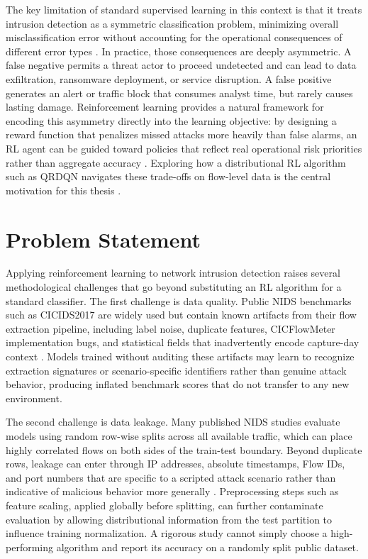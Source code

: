 The key limitation of standard supervised learning in this context is that it treats intrusion detection as a symmetric classification problem, minimizing overall misclassification error without accounting for the operational consequences of different error types \parencite{Axelsson1999BaseRate}. In practice, those consequences are deeply asymmetric. A false negative permits a threat actor to proceed undetected and can lead to data exfiltration, ransomware deployment, or service disruption. A false positive generates an alert or traffic block that consumes analyst time, but rarely causes lasting damage. Reinforcement learning provides a natural framework for encoding this asymmetry directly into the learning objective: by designing a reward function that penalizes missed attacks more heavily than false alarms, an RL agent can be guided toward policies that reflect real operational risk priorities rather than aggregate accuracy \parencite{SuttonBarto2018RL,Lee2002CostSensitiveIDS}. Exploring how a distributional RL algorithm such as QRDQN navigates these trade-offs on flow-level data is the central motivation for this thesis \parencite{Dabney2018QRDQN}.

\section{Problem Statement}
Applying reinforcement learning to network intrusion detection raises several methodological challenges that go beyond substituting an RL algorithm for a standard classifier. The first challenge is data quality. Public NIDS benchmarks such as CICIDS2017 are widely used but contain known artifacts from their flow extraction pipeline, including label noise, duplicate features, CICFlowMeter implementation bugs, and statistical fields that inadvertently encode capture-day context \parencite{Ring2019DatasetSurvey,Engelen2021CICIDSIssues,Lanvin2023Errors}. Models trained without auditing these artifacts may learn to recognize extraction signatures or scenario-specific identifiers rather than genuine attack behavior, producing inflated benchmark scores that do not transfer to any new environment.

The second challenge is data leakage. Many published NIDS studies evaluate models using random row-wise splits across all available traffic, which can place highly correlated flows on both sides of the train-test boundary. Beyond duplicate rows, leakage can enter through IP addresses, absolute timestamps, Flow IDs, and port numbers that are specific to a scripted attack scenario rather than indicative of malicious behavior more generally \parencite{Arp2020DosDontsMLSecurity,Kaufman2011LeakageDataMining}. Preprocessing steps such as feature scaling, applied globally before splitting, can further contaminate evaluation by allowing distributional information from the test partition to influence training normalization. A rigorous study cannot simply choose a high-performing algorithm and report its accuracy on a randomly split public dataset.

